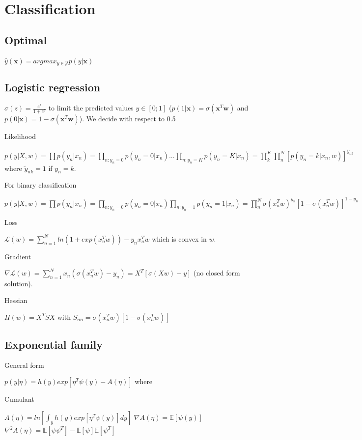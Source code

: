 \section{Classification}
\subsection{Optimal}
$\hat{y}(\mathbf{x}) = argmax_{y\in \mathcal{Y}} p(y|\mathbf{x})$

\subsection{Logistic regression}
$\sigma(z) = \frac{e^z}{1+e^z}$ to limit the predicted values $y\in [0;1]$ ($p(1|\mathbf{x}) = \sigma(\mathbf{x}^T\mathbf{w})$ and $p(0|\mathbf{x}) = 1-\sigma(\mathbf{x}^T\mathbf{w})$). We decide with respect to 0.5

Likelihood

$p(y | X,w) = \prod p(y_n|x_n) = \prod_{n:y_n=0} p(y_n=0|x_n) ... \prod_{n:y_n=K} p(y_n=K|x_n) = \prod^K_k \prod^N_n [p(y_n = k | x_n,w)]^{\tilde{y}_{nk}}$ where ${\tilde{y}_{nk}} = 1$ if $y_n=k$.

For binary classification

$p(y | X, w) = \prod p(y_n|x_n) = \prod_{n:y_n=0} p(y_n=0|x_n) \prod_{n:y_n=1} p(y_n=1|x_n) = \prod^N_n \sigma({x_n^T w})^{y_n}[1-\sigma({x_n^T w})]^{1-y_n}$

Loss

$\mathcal{L}(w) = \sum_{n=1}^N ln(1 + exp(x_n^T w)) - y_n x_n^T w$ which is convex in $w$.

Gradient

$\nabla \mathcal{L}(w) = \sum_{n=1}^N x_n (\sigma(x_n^T w) - y_n) = X^T[\sigma(Xw) - y]$ (no closed form solution).

Hessian

$H(w) = X^T S X$ with $S_{nn} = \sigma(x_n^T w)[1-\sigma(x_n^T w)]$

\subsection{Exponential family}
General form

$p(y|\eta) = h(y) exp[\eta^T \psi(y) - A(\eta)]$ where

Cumulant

$A(\eta) = ln[\int_y h(y) exp[\eta^T \psi(y)] dy]$
\newline
$\nabla A(\eta) = \mathbb{E}[\psi(y)]$
\newline
$\nabla^2 A(\eta) = \mathbb{E}[\psi\psi^T] - \mathbb{E}[\psi]\mathbb{E}[\psi^T]$

